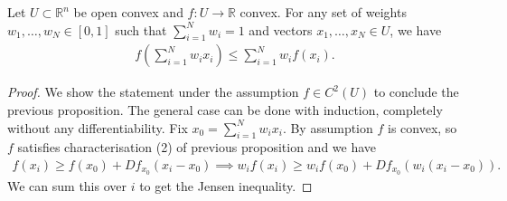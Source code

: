 \begin{prop}\label{prop:jensen}
	Let $U \subset \mathbb{R}^{n}$ be open convex and $f: U \to \mathbb{R}$ convex.
	For any set of weights $w_{1}, \dots, w_{N} \in [0,1]$ such that $\sum_{i=1}^{N} w_{i} = 1$ and vectors $x_{1}, \dots, x_{N} \in U$, we have
	\begin{align*}
		f \left( \sum_{i=1}^{N} w_{i} x_{i} \right) \leq \sum_{i=1}^{N} w_{i}f(x_{i}).
	\end{align*}
\end{prop}
\begin{proof}
	We show the statement under the assumption $f \in C^{2}(U)$ to conclude the previous proposition. The general case can be done with induction, completely without any differentiability. Fix $x_{0} = \sum_{i=1}^{N} w_{i}x_{i}$. By assumption $f$ is convex, so $f$ satisfies characterisation (2) of previous proposition and we have
	\begin{align*}
		f(x_{i}) \geq f(x_{0}) + Df_{x_{0}}(x_{i} - x_{0}) \implies w_{i}f(x_{i}) \geq w_{i} f(x_{0}) + Df_{x_{0}}(w_{i}(x_{i} - x_{0})).
	\end{align*}
	We can sum this over $i$ to get the Jensen inequality.
\end{proof}

